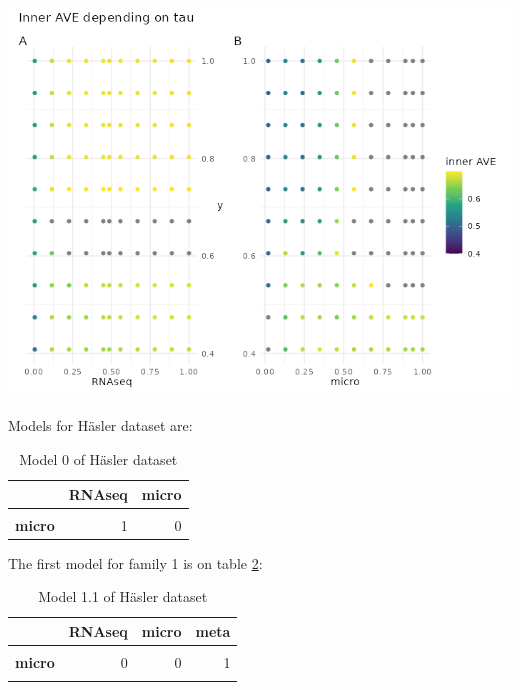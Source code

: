\documentclass[
  a4paper,
]{book}
\let\origfigure\figure
\let\endorigfigure\endfigure
\renewenvironment{figure}[1][2] {
    \expandafter\origfigure\expandafter[!ht]
} {
    \endorigfigure
}
\begin{document}
\begin{figure}
\centering
\includegraphics{images/hasler-centroid_tau.png}
\caption{\label{fig:hasler-tau} Changes on tau on the centroid scheme on the Häsler dataset affect the inner AVE score on the model 1. The panel A shows on the ordinate the RNAseq tau value, the panel B on the right, shows the tau of the microorganism; both of them show the y's tau on the abscissa.}
\end{figure}

Models for Häsler dataset are:

\begin{table}[H]

\caption[Model 0 of Häsler dataset]{\label{tab:hasler-model-0}Model 0 of Häsler dataset}
\centering
\begin{tabular}[t]{>{}l||r|r}
\hline
  & RNAseq & micro\\
\hline
\textbf{\cellcolor{gray!6}{RNAseq}} & \cellcolor{gray!6}{0} & \cellcolor{gray!6}{1}\\
\hline
\textbf{micro} & 1 & 0\\
\hline
\end{tabular}
\end{table}

The first model for family 1 is on table \ref{tab:hasler-model-1-1}:

\begin{table}[H]

\caption[Model 1.1 of Häsler dataset]{\label{tab:hasler-model-1-1}Model 1.1 of Häsler dataset}
\centering
\begin{tabular}[t]{>{}l||r|r|r}
\hline
  & RNAseq & micro & meta\\
\hline
\textbf{\cellcolor{gray!6}{RNAseq}} & \cellcolor{gray!6}{0} & \cellcolor{gray!6}{0} & \cellcolor{gray!6}{1}\\
\hline
\textbf{micro} & 0 & 0 & 1\\
\hline
\textbf{\cellcolor{gray!6}{meta}} & \cellcolor{gray!6}{1} & \cellcolor{gray!6}{1} & \cellcolor{gray!6}{0}\\
\hline
\end{tabular}
\end{table}
\end{document}
